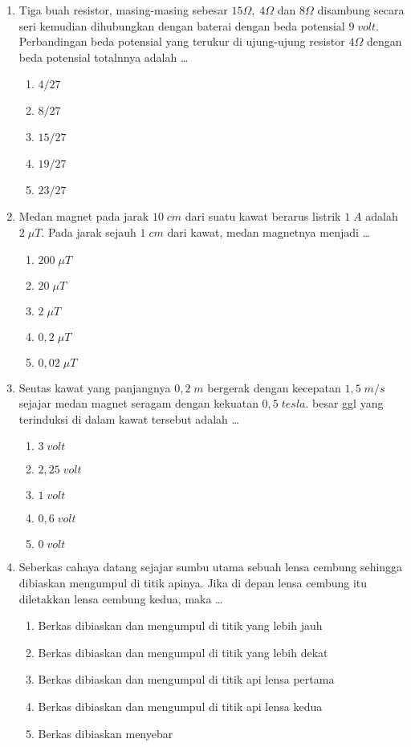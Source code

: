 \documentclass[A4,12PT, english, twocolumn]{journal}
\begin{document}
\begin{enumerate}
\item Tiga buah resistor, masing-masing sebesar $15\Omega, \; 4\Omega$ dan $8\Omega$ disambung secara seri kemudian dihubungkan dengan baterai dengan beda potensial $9 \; volt$. Perbandingan beda potensial yang terukur di ujung-ujung resistor $4\Omega$ dengan beda potensial totalnnya adalah \dots
   \begin{enumerate}
        \item $4/27$
        \item $8/27$
        \item $15/27$
        \item $19/27$
        \item $23/27$
   \end{enumerate}
   
\item Medan magnet pada jarak $10 \; cm$ dari suatu kawat berarus listrik $1 \; A$ adalah $2 \; \mu T$. Pada jarak sejauh $1 \; cm$ dari kawat, medan magnetnya menjadi \dots
    \begin{enumerate}
        \item $200 \; \mu T$
        \item $20 \; \mu T$
        \item $2 \; \mu T$
        \item $0,2 \; \mu T$
        \item $0,02 \; \mu T$
    \end{enumerate}
  
\item Seutas kawat yang panjangnya $0,2 \; m$ bergerak dengan kecepatan $1,5 \; m/s$ sejajar medan magnet seragam dengan kekuatan $0,5 \; tesla$. besar ggl yang terinduksi di dalam kawat tersebut adalah \dots
    \begin{enumerate}
        \item $3 \; volt$
        \item $2,25 \; volt$
        \item $1 \; volt$
        \item $0,6 \; volt$
        \item $0 \; volt$
    \end{enumerate}
    
\item Seberkas cahaya datang sejajar sumbu utama sebuah lensa cembung sehingga dibiaskan mengumpul di titik apinya. Jika di depan lensa cembung itu diletakkan lensa cembung kedua, maka \dots
    \begin{enumerate}
        \item Berkas dibiaskan dan mengumpul di titik yang lebih jauh
        \item Berkas dibiaskan dan mengumpul di titik yang lebih dekat
        \item Berkas dibiaskan dan mengumpul di titik api lensa pertama
        \item Berkas dibiaskan dan mengumpul di titik api lensa kedua
        \item Berkas dibiaskan menyebar
    \end{enumerate}


\end{enumerate}
\end{document}
